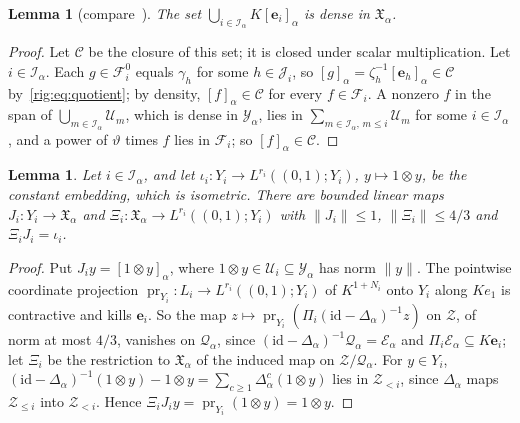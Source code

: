 \documentclass[11pt]{amsart}
\newtheorem{lemma}[theorem]{Lemma}
\theoremstyle{definition}
\theoremstyle{remark}
\numberwithin{equation}{section}
\newcommand{\id}{\mathrm{id}}
\newcommand{\norm}[1]{\lVert #1\rVert}
\theoremstyle{plain}
\theoremstyle{definition}
\theoremstyle{plain}
\newcommand{\fX}{\mathfrak X}
\begin{document}
\begin{lemma}[compare~{\cite[Lemma~3.5]{KR}}]\label{rig:lem:dense}
The set $\bigcup_{i\in\mathcal I_\alpha}K[\mathbf e_i]_\alpha$ is dense in $\fX_\alpha$.
\end{lemma}

\begin{proof}
Let $\mathcal C$ be the closure of this set; it is closed under scalar multiplication. Let $i\in\mathcal I_\alpha$. Each
$g\in\mathcal F^0_i$ equals $\gamma_h$ for some $h\in\mathcal J_i$, so $[g]_\alpha=\zeta_h^{-1}[\mathbf e_h]_\alpha\in\mathcal C$
by~\eqref{rig:eq:quotient}; by density, $[f]_\alpha\in\mathcal C$ for every $f\in\mathcal F_i$. A nonzero $f$ in the span
of $\bigcup_{m\in\mathcal I_\alpha}\mathcal U_m$, which is dense in $\mathcal Y_\alpha$, lies in
$\sum_{m\in\mathcal I_\alpha,\,m\le i}\mathcal U_m$ for some $i\in\mathcal I_\alpha$, and a power of $\vartheta$ times $f$
lies in $\mathcal F_i$; so $[f]_\alpha\in\mathcal C$.
\end{proof}

\begin{lemma}\label{rig:lem:readouts}
Let $i\in\mathcal I_\alpha$, and let $\iota_i\colon Y_i\to L^{r_i}((0,1);Y_i)$, $y\mapsto1\otimes y$, be the constant
embedding, which is isometric. There are bounded linear maps $J_i\colon Y_i\to\fX_\alpha$ and
$\Xi_i\colon\fX_\alpha\to L^{r_i}((0,1);Y_i)$ with $\norm{J_i}\le1$, $\norm{\Xi_i}\le4/3$ and $\Xi_iJ_i=\iota_i$.
\end{lemma}

\begin{proof}
Put $J_iy=[1\otimes y]_\alpha$, where $1\otimes y\in\mathcal U_i\subseteq\mathcal Y_\alpha$ has norm $\norm y$. The
pointwise coordinate projection $\operatorname{pr}_{Y_i}\colon L_i\to L^{r_i}((0,1);Y_i)$ of $K^{1+N_i}$ onto $Y_i$ along
$Ke_1$ is contractive and kills $\mathbf e_i$. So the map $z\mapsto\operatorname{pr}_{Y_i}(\Pi_i(\id-\Delta_\alpha)^{-1}z)$
on $\mathcal Z$, of norm at most $4/3$, vanishes on $\mathcal Q_\alpha$, since
$(\id-\Delta_\alpha)^{-1}\mathcal Q_\alpha=\mathcal E_\alpha$ and $\Pi_i\mathcal E_\alpha\subseteq K\mathbf e_i$; let
$\Xi_i$ be the restriction to $\fX_\alpha$ of the induced map on $\mathcal Z/\mathcal Q_\alpha$. For $y\in Y_i$,
$(\id-\Delta_\alpha)^{-1}(1\otimes y)-1\otimes y=\sum_{c\ge1}\Delta_\alpha^c(1\otimes y)$ lies in $\mathcal Z_{<i}$,
since $\Delta_\alpha$ maps $\mathcal Z_{\le i}$ into $\mathcal Z_{<i}$. Hence
$\Xi_iJ_iy=\operatorname{pr}_{Y_i}(1\otimes y)=1\otimes y$.
\end{proof}
\end{document}
